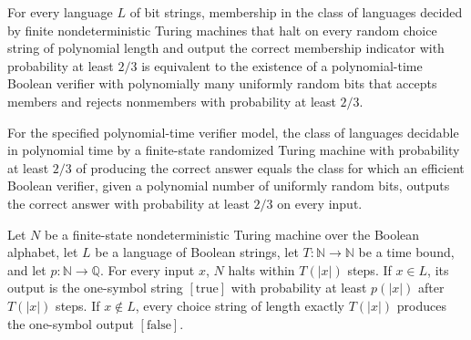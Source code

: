 \begin{theorem}
\label{Randomized.mem_BPP_PTM_iff}
\leanok
{}
For every language $L$ of bit strings, membership in the class of languages decided by
finite nondeterministic Turing machines that halt on every random choice string of
polynomial length and output the correct membership indicator with probability at least
$2/3$ is equivalent to the existence of a polynomial-time Boolean verifier with
polynomially many uniformly random bits that accepts members and rejects nonmembers with
probability at least $2/3$.
\end{theorem}

\begin{theorem}
\label{Randomized.BPP_PTM_eq}
\leanok
{}
For the specified polynomial-time verifier model, the class of languages decidable in
polynomial time by a finite-state randomized Turing machine with probability at least
$2/3$ of producing the correct answer equals the class for which an efficient Boolean
verifier, given a polynomial number of uniformly random bits, outputs the correct answer
with probability at least $2/3$ on every input.
\end{theorem}

\begin{definition}
\label{Turing.FinNDTM.RDecidesInTimeWith}
\leanok
{}
Let $N$ be a finite-state nondeterministic Turing machine over the Boolean alphabet, let
$L$ be a language of Boolean strings, let $T:\mathbb{N}\to\mathbb{N}$ be a time bound,
and let $p:\mathbb{N}\to\mathbb{Q}$. For every input $x$, $N$ halts within
$T(|x|)$ steps. If $x\in L$, its output is the one-symbol string $[\mathrm{true}]$
with probability at least $p(|x|)$ after $T(|x|)$ steps. If $x\notin L$, every choice
string of length exactly $T(|x|)$ produces the one-symbol output $[\mathrm{false}]$.
\end{definition}

